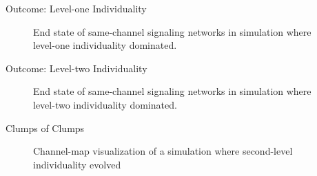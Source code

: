 \begin{frame}{Outcome: Level-one Individuality}
\begin{figure}
\begin{columns}
\begin{column}{0.6\textwidth}
\end{column}
\begin{column}{0.4\textwidth}
\caption{
End state of same-channel signaling networks in simulation where level-one individuality dominated.
}
\end{column}
\end{columns}
\end{figure}
\end{frame}

\begin{frame}{Outcome: Level-two Individuality}
\begin{figure}
\begin{columns}
\begin{column}{0.6\textwidth}
\end{column}
\begin{column}{0.4\textwidth}
\caption{
End state of same-channel signaling networks in simulation where level-two individuality dominated.
}
\end{column}
\end{columns}
\end{figure}
\end{frame}

\begin{frame}{Clumps of Clumps}
\begin{figure}
\begin{columns}
\begin{column}{0.6\textwidth}
\end{column}
\begin{column}{0.4\textwidth}
%
%
%
%
%
%
%

\vspace{8ex}

\caption{Channel-map visualization of a simulation where second-level individuality evolved}
\end{column}
\end{columns}
\end{figure}
\end{frame}

